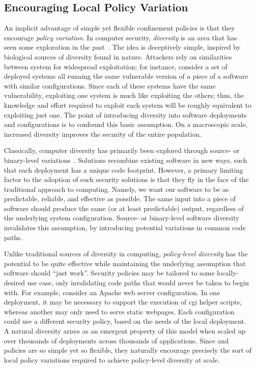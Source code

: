 \subsection{Encouraging Local Policy Variation}

An implicit advantage of simple yet flexible confinement policies is that they encourage
\textit{policy variation}. In computer security, \textit{diversity} is an area that has
seen some exploration in the past~\cite{somayaji2007_immunology, persaud2016_frankenssl,
matrawy2005_mitigating, neti2012_software}. The idea is deceptively simple, inspired by
biological sources of diversity found in nature. Attackers rely on similarities between
system for widespread exploitation; for instance, consider a set of deployed systems all
running the same vulnerable version of a piece of a software with similar configurations.
Since each of these systems have the same vulnerability, exploiting one system is much
like exploiting the others; thus, the knowledge and effort required to exploit each system
will be roughly equivalent to exploiting just one. The point of introducing diversity into
software deployments and configurations is to confound this basic assumption. On
a macroscopic scale, increased diversity improves the security of the entire population.

Classically, computer diversity has primarily been explored through source- or
binary-level variations~\cite{somayaji2007_immunology, persaud2016_frankenssl,
neti2012_software}. Solutions recombine existing software in new ways, such that each
deployment has a unique code footprint. However, a primary limiting factor to the adoption
of such security solutions is that they fly in the face of the traditional approach to
computing. Namely, we want our software to be as predictable, reliable, and effective as
possible. The same input into a piece of software should produce the same (or at least
predictable) output, regardless of the underlying system configuration. Source- or
binary-level software diversity invalidates this assumption, by introducing potential
variations in common code paths.

Unlike traditional sources of diversity in computing, \textit{policy-level diversity} has
the potential to be quite effective while maintaining the underlying assumption that
software should \enquote{just work}. Security policies may be tailored to some
locally-desired use case, only invalidating code paths that would never be taken to begin
with. For example, consider an Apache web server configuration. In one deployment, it may
be necessary to support the execution of \gls{cgi} helper scripts, whereas another may
only need to serve static webpages. Each configuration could use a different security
policy, based on the needs of the local deployment. A natural diversity arises as an
emergent property of this model when scaled up over thousands of deployments across
thousands of applications.  Since \bpfbox{} and \bpfcontain{} policies are so simple yet
so flexible, they naturally encourage precisely the sort of local policy variations
required to achieve policy-level diversity at scale.


